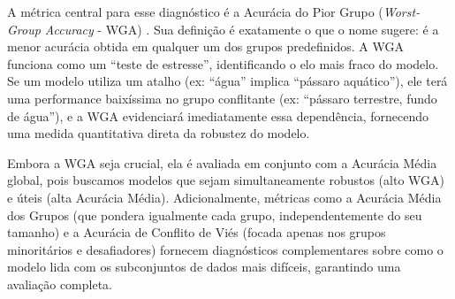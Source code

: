 A métrica central para esse diagnóstico é a Acurácia do Pior Grupo (\textit{Worst-Group Accuracy} - WGA) \cite{wga_reference}. Sua definição é exatamente o que o nome sugere: é a menor acurácia obtida em qualquer um dos grupos predefinidos. A WGA funciona como um ``teste de estresse'', identificando o elo mais fraco do modelo. Se um modelo utiliza um atalho (ex: ``água'' implica ``pássaro aquático''), ele terá uma performance baixíssima no grupo conflitante (ex: ``pássaro terrestre, fundo de água''), e a WGA evidenciará imediatamente essa dependência, fornecendo uma medida quantitativa direta da robustez do modelo.

Embora a WGA seja crucial, ela é avaliada em conjunto com a Acurácia Média global, pois buscamos modelos que sejam simultaneamente robustos (alto WGA) e úteis (alta Acurácia Média). Adicionalmente, métricas como a Acurácia Média dos Grupos (que pondera igualmente cada grupo, independentemente do seu tamanho) e a Acurácia de Conflito de Viés (focada apenas nos grupos minoritários e desafiadores) fornecem diagnósticos complementares sobre como o modelo lida com os subconjuntos de dados mais difíceis, garantindo uma avaliação completa.